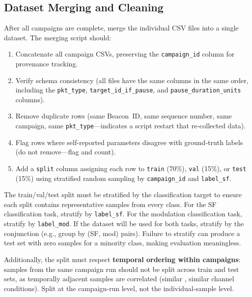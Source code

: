 \documentclass[11pt,letterpaper]{article}
\begin{document}
	\subsection{Dataset Merging and Cleaning}

	After all campaigns are complete, merge the individual CSV files into a single dataset. The merging script should:

	\begin{enumerate}[leftmargin=2em]
		\item Concatenate all campaign CSVs, preserving the \texttt{campaign\_id} column for provenance tracking.
		\item Verify schema consistency (all files have the same columns in the same order, including the \texttt{pkt\_type}, \texttt{target\_id\_if\_pause}, and \texttt{pause\_duration\_units} columns).
		\item Remove duplicate rows (same Beacon~ID, same sequence number, same campaign, same \texttt{pkt\_type}---indicates a script restart that re-collected data).
		\item Flag rows where self-reported parameters disagree with ground-truth labels (do not remove---flag and count).
		\item Add a \texttt{split} column assigning each row to \texttt{train} (70\%), \texttt{val} (15\%), or \texttt{test} (15\%) using stratified random sampling by \texttt{campaign\_id} and \texttt{label\_sf}.
	\end{enumerate}

	\begin{tcolorbox}[warning={Stratified Splitting}]
		The train/val/test split must be stratified by the classification target to ensure each split contains representative samples from every class. For the SF classification task, stratify by \texttt{label\_sf}. For the modulation classification task, stratify by \texttt{label\_mod}. If the dataset will be used for both tasks, stratify by the conjunction (e.g., group by (SF, mod) pairs). Failure to stratify can produce a test set with zero samples for a minority class, making evaluation meaningless.

		Additionally, the split must respect \textbf{temporal ordering within campaigns}: samples from the same campaign run should not be split across train and test sets, as temporally adjacent samples are correlated (similar \RSSI{}, similar channel conditions). Split at the campaign-run level, not the individual-sample level.
	\end{tcolorbox}
\end{document}
